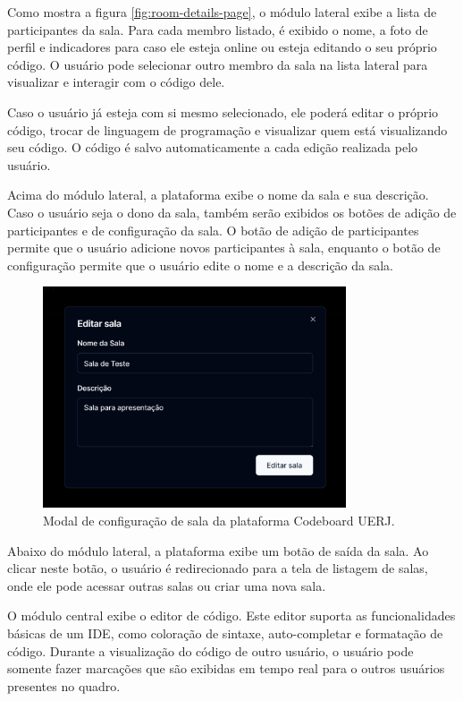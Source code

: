 Como mostra a figura \ref{fig:room-details-page}, o módulo lateral exibe a lista de participantes da sala. Para cada membro listado, é exibido o nome, a foto de perfil e indicadores para caso ele esteja online ou esteja editando o seu próprio código. O usuário pode selecionar outro membro da sala na lista lateral para visualizar e interagir com o código dele.

Caso o usuário já esteja com si mesmo selecionado, ele poderá editar o próprio código, trocar de linguagem de programação e visualizar quem está visualizando seu código. O código é salvo automaticamente a cada edição realizada pelo usuário.

Acima do módulo lateral, a plataforma exibe o nome da sala e sua descrição. Caso o usuário seja o dono da sala, também serão exibidos os botões de adição de participantes e de configuração da sala. O botão de adição de participantes permite que o usuário adicione novos participantes à sala, enquanto o botão de configuração permite que o usuário edite o nome e a descrição da sala.

\begin{figure}[H]
    \centering
    \includegraphics[width=0.8\textwidth]{assets/codeboard/edit-room-modal.png}
    \caption{Modal de configuração de sala da plataforma Codeboard UERJ.}
    \label{fig:edit-room-modal}
\end{figure}


Abaixo do módulo lateral, a plataforma exibe um botão de saída da sala. Ao clicar neste botão, o usuário é redirecionado para a tela de listagem de salas, onde ele pode acessar outras salas ou criar uma nova sala.

O módulo central exibe o editor de código. Este editor suporta as funcionalidades básicas de um IDE, como coloração de sintaxe, auto-completar e formatação de código. Durante a visualização do código de outro usuário, o usuário pode somente fazer marcações que são exibidas em tempo real para o outros usuários presentes no quadro.

